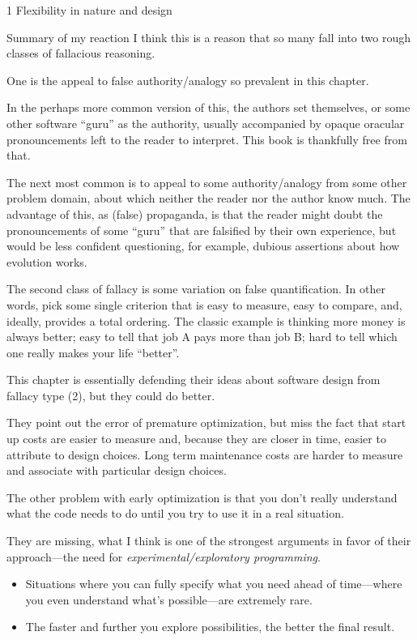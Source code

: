 \documentclass[12pt]{PalisadesLakesBook}
\begin{document}
\begin{plSection}{}
\begin{plSection}{1 Flexibility in nature and design}
\begin{plSection}{Summary of my reaction}
I think this is a reason that so many fall into two rough classes
of fallacious reasoning. 

One is the appeal to false authority/analogy so prevalent in this 
chapter. 

In the perhaps more common version of this, the authors set 
themselves, or some other software ``guru'' as the authority, 
usually accompanied by opaque oracular pronouncements 
left to the reader
to interpret.
This book is thankfully free from that.

The next most common is to appeal to some authority/analogy
from some other problem domain,
about which neither the reader nor the author know much.
The advantage of this, as (false) propaganda, 
is that the reader might doubt the pronouncements
of some ``guru'' that are falsified by their own experience,
but would be less confident questioning, for example,
dubious assertions about how evolution works.

The second class of fallacy is some variation on false 
quantification. 
In other words, pick some single criterion that is
easy to measure, easy to compare, and, ideally,
provides a total ordering. 
The classic example is thinking more money is always better;
easy to tell that job A pays more than job B;
hard to tell which one really makes your life ``better''.

This chapter is essentially defending their ideas about software
design from fallacy type (2),
but they could do better.

They point out the error of premature optimization,
but miss the fact that start up costs are easier to measure
and, because they are closer in time, easier to attribute to
design choices. 
Long term maintenance costs are harder to measure and
associate with particular design choices.

The other problem with early optimization is that you don't
really understand what the code needs to do until you try to
use it in a real situation.

They are missing, what I think is one of the strongest arguments
in favor of their approach---the need for 
\emph{experimental/exploratory programming}.
\begin{itemize}

  \item Situations where you can fully specify what you need
  ahead of time---where you even understand what's 
  possible---are extremely rare.

  \item The faster and further you explore possibilities,
  the better the final result.


\end{itemize}
\end{plSection}
\end{plSection}
\end{plSection}
\end{document}
